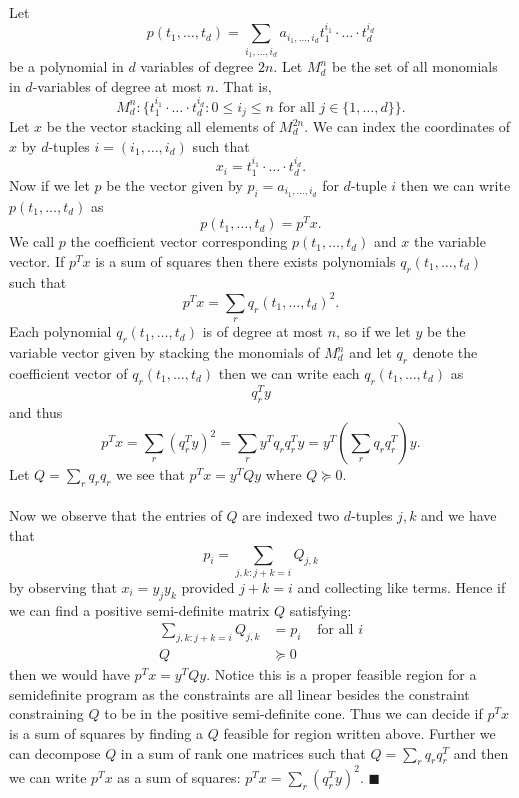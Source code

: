 \documentclass[letterpaper,12pt,oneside,onecolumn]{article}
\newcommand{\1}{\mathbbm{1}}
\begin{document}
\paragraph{}
Let $$p(t_1, \dots,t_d) = \sum_{i_1, \dots, i_d} a_{i_1, \dots, i_d} t_1^{i_1} \cdot \dots \cdot t_d^{i_d}$$ be a polynomial in $d$ variables of degree $2n$. Let $M_d^{n}$ be the set of all monomials in $d$-variables of degree at most $n$. That is,
$$M_d^{n} : \{ t_1^{i_1}\cdot\dots \cdot t_d^{i_d} : 0 \leq i_j \leq n \text{ for all } j \in \{1, \dots, d\}\}.$$
Let $x$ be the vector stacking all elements of $M_d^{2n}$. We can index the coordinates of $x$ by $d$-tuples $i = (i_1, \dots, i_d)$ such that
$$x_i = t_1^{i_1}\cdot \dots\cdot t_d^{i_d}.$$
Now if we let $p$ be the vector given by $p_i = a_{i_1, \dots, i_d}$ for $d$-tuple $i$ then we can write $p(t_1, \dots, t_d)$ as
$$p(t_1, \dots, t_d) = p^Tx.$$
We call $p$ the coefficient vector corresponding $p(t_1, \dots, t_d)$ and $x$ the variable vector. If $p^Tx$ is a sum of squares then there exists polynomials $q_r(t_1,\dots,t_d)$ such that
$$p^Tx = \sum_r q_r(t_1,\dots, t_d)^2.$$
Each polynomial $q_r(t_1, \dots, t_d)$ is of degree at most $n$, so if we let $y$ be the variable vector given by stacking the monomials of $M_d^n$ and let $q_r$ denote the coefficient vector of $q_r(t_1,\dots,t_d)$ then we can write each $q_r(t_1,\dots,t_d)$ as
$$q_r^Ty$$
and thus
$$p^Tx = \sum_r (q_r^Ty)^2 = \sum_r y^Tq_rq_r^Ty = y^T(\sum_r q_rq_r^T)y.$$
Let $Q = \sum_r q_rq_r$ we see that $p^Tx = y^TQy$ where $Q \succcurlyeq 0$.
\paragraph{}
Now we observe that the entries of $Q$ are indexed two $d$-tuples $j,k$ and we have that
$$p_i = \sum_{j,k : j+k = i} Q_{j,k}$$
by observing that $x_i = y_j y_k$ provided $j + k = i$ and collecting like terms. Hence if we can find a positive semi-definite matrix $Q$ satisfying:
\begin{align*}
\sum_{j,k:j+k = i} Q_{j,k} &= p_i &\text{ for all $i$}\\
Q&\succcurlyeq 0 
\end{align*}
then we would have $p^Tx = y^TQy$. Notice this is a proper feasible region for a semidefinite program as the constraints are all linear besides the constraint constraining $Q$ to be in the positive semi-definite cone. Thus we can decide if $p^Tx$ is a sum of squares by finding a $Q$ feasible for region written above. Further we can decompose $Q$ in a sum of rank one matrices such that $Q = \sum_r q_rq_r^T$ and then we can write $p^Tx$ as a sum of squares: $p^Tx = \sum_r (q_r^Ty)^2$. $\blacksquare$
\end{document}
